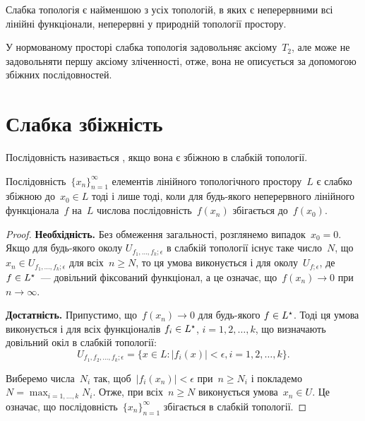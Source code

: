\begin{remark}
Слабка топологія є найменшою з усіх
топологій, в яких є неперервними всі лінійні функціонали,
неперервні у природній топології простору.
\end{remark}

\begin{remark}
У нормованому просторі слабка
топологія задовольняє аксіому~$T_2$, але може не задовольняти
першу аксіому зліченності, отже, вона не описується за
допомогою збіжних послідовностей.
\end{remark}

\section{Слабка збіжність}

\begin{definition}
Послідовність 
називається ,
якщо вона є збіжною в слабкій топології.
\end{definition}

\begin{lemma}
Послідовність~$\{x_n\}_{n = 1}^\infty$
елементів лінійного топологічного простору~$L$ є слабко збіжною до~$x_0 \in L$ тоді
і лише тоді, коли для будь-якого неперервного лінійного
функціонала~$f$ на~$L$ числова послідовність~$f(x_n)$
збігається до~$f(x_0)$.
\end{lemma}

\begin{proof}
\textbf{Необхідність.} Без обмеження загальності,
розглянемо випадок~$x_0 = 0$. Якщо для будь-якого околу
$U_{f_1, \dots, f_k; \epsilon}$ в слабкій топології існує таке число~$N$, що
$x_n \in U_{f_1, \dots, f_k; \epsilon}$ для всіх~$n \ge N$, то ця умова виконується і для
околу~$U_{f;\epsilon}$, де~$f \in L^\star$~--- довільний фіксований функціонал, а
це означає, що~$f(x_n) \to 0$ при~$n \to \infty$.

\textbf{Достатність.} Припустимо, що~$f(x_n) \to 0$ для будь-якого
$f \in L^\star$. Тоді ця умова виконується і для всіх функціоналів
$f_i \in L^\star$, $i = 1, 2, \dots, k$, що визначають довільний окіл в слабкій
топології:
\begin{equation*}
    U_{f_1, f_2, \dots, f_k; \epsilon} =
    \{ x \in L: |f_i(x)| < \epsilon, i = 1, 2, \dots, k \}.
\end{equation*}

Виберемо числа~$N_i$ так, щоб~$|f_i(x_n)| < \epsilon$ при~$n \ge N_i$ і
покладемо~$N = \max_{i = 1, \dots, k} N_i$. Отже, при всіх~$n \ge N$ виконується
умова~$x_n \in U$. Це означає, що послідовність~$\{x_n\}_{n = 1}^\infty$
збігається в слабкій топології. 
\end{proof}

